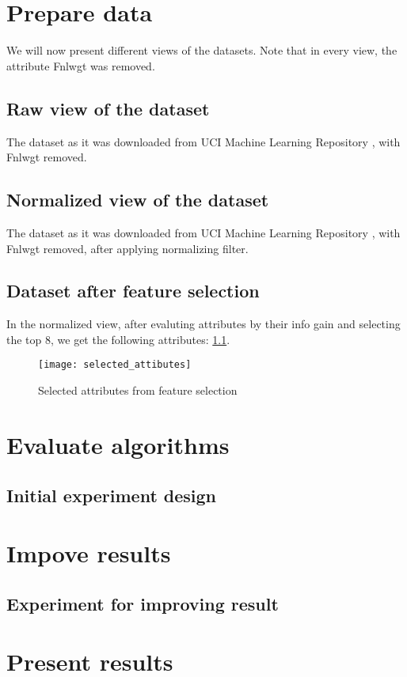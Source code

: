 \chapter{Prepare data}
We will now present different views of the datasets. Note that in every view, the attribute Fnlwgt was removed.
\section{Raw view of the dataset}
The dataset as it was downloaded from UCI Machine Learning Repository \cite{uci-link}, with Fnlwgt removed.
\section{Normalized view of the dataset}
The dataset as it was downloaded from UCI Machine Learning Repository \cite{uci-link}, with Fnlwgt removed, after applying normalizing filter.
\section{Dataset after feature selection}
In the normalized view, after evaluting attributes by their info gain and selecting the top 8, we get the following attributes: \ref{fig:attr}.
\begin{figure}
    \centering
    \texttt{[image: selected\_attibutes]}
    \caption{Selected attributes from feature selection}
    \label{fig:attr}
\end{figure}

\chapter{Evaluate algorithms}
\section{Initial experiment design}

\chapter{Impove results}
\section{Experiment for improving result}

\chapter{Present results}